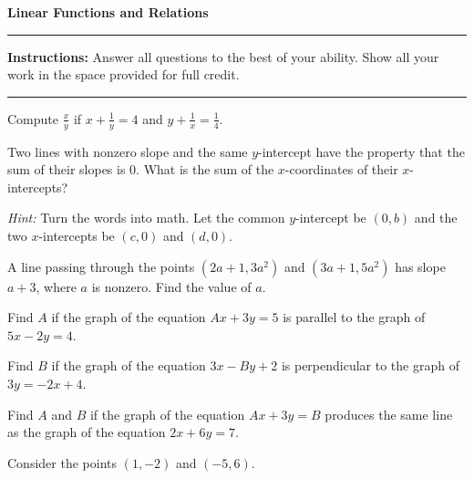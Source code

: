 \documentclass[12pt]{exam}
\newcommand{\examtitle}{Linear Functions and Relations}
\newcommand{\instructions}{
    \noindent\rule{\textwidth}{0.5pt}
    \begin{center}
    \textbf{Instructions:} Answer all questions to the best of your ability. Show all your work in the space provided for full credit.
    \end{center}
    \noindent\rule{\textwidth}{0.5pt}
}
\begin{document}
\begin{center}
\textbf{\Large \examtitle} \\
\vspace{0.5cm}
\hspace{0.1\textwidth}
\end{center}

\instructions
\vspace{0.5cm}

\begin{questions}

\pointsinrightmargin

\question[8]
Compute $\frac{x}{y}$ if $x + \frac{1}{y} = 4$ and $y + \frac{1}{x} = \frac{1}{4}$.
\vspace*{5cm}

\question[10]
Two lines with nonzero slope and the same $y$-intercept have the property that the sum of their slopes is 0. What is the sum of the $x$-coordinates of their $x$-intercepts?

\textit{Hint:} Turn the words into math. Let the common $y$-intercept be $(0, b)$ and the two $x$-intercepts be $(c, 0)$ and $(d, 0)$.
\vspace*{6cm}

\newpage

\question[12]
A line passing through the points $(2a + 1, 3a^2)$ and $(3a + 1, 5a^2)$ has slope $a + 3$, where $a$ is nonzero. Find the value of $a$.
\vspace*{6cm}



\question[12]
Find $A$ if the graph of the equation $Ax + 3y = 5$ is parallel to the graph of $5x - 2y = 4$.
\vspace*{4cm}

\question[12]
Find $B$ if the graph of the equation $3x - By + 2$ is perpendicular to the graph of $3y = -2x + 4$.
\vspace*{4cm}

\newpage

\question[12]
Find $A$ and $B$ if the graph of the equation $Ax + 3y = B$ produces the same line as the graph of the equation $2x + 6y = 7$.
\vspace*{4cm}

\question[10]
Consider the points $(1, -2)$ and $(-5, 6)$.
\end{questions}
\end{document}
